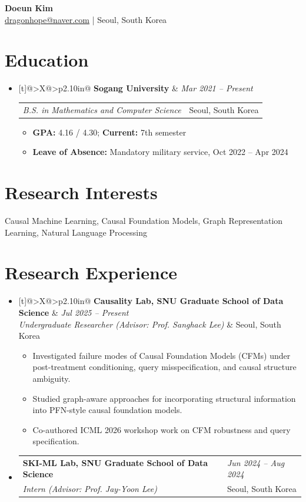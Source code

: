 \documentclass[11pt,a4paper]{article}
\makeatletter
\newcommand{\cvitem}[4]{%
  \item \begin{tabularx}{\linewidth}[t]{@{}>{\RaggedRight\arraybackslash}X@{\hspace{0.8em}}>{\RaggedLeft\arraybackslash}p{2.10in}@{}}
  \textbf{#1} & \textit{#2}\\
  \textit{#3} & #4
  \end{tabularx}\vspace{-0.18em}
}
\newcommand{\cvitemplain}[2]{%
  \item \begin{tabularx}{\linewidth}[t]{@{}>{\RaggedRight\arraybackslash}X@{\hspace{0.8em}}>{\RaggedLeft\arraybackslash}p{2.10in}@{}}
  \textbf{#1} & \textit{#2}
  \end{tabularx}\vspace{-0.18em}
}
\makeatother
\begin{document}
\begin{center}
    {\Huge \bfseries Doeun Kim}\\[0.38em]
    \href{mailto:dragonhope@naver.com}{dragonhope@naver.com} \; | \; Seoul, South Korea
\end{center}
\vspace{0.16em}

\section*{Education}
\begin{itemize}[label=$\bullet$, leftmargin=0.70em]
  \cvitemplain{Sogang University}{Mar 2021 -- Present}
  \vspace{-0.08em}
  \begin{tabularx}{\linewidth}{@{}Xr@{}}
  \textit{B.S. in Mathematics and Computer Science} & Seoul, South Korea
  \end{tabularx}
  \begin{itemize}
    \item \textbf{GPA:} 4.16 / 4.30; \textbf{Current:} 7th semester
    \item \textbf{Leave of Absence:} Mandatory military service, Oct 2022 -- Apr 2024
  \end{itemize}
\end{itemize}

\section*{Research Interests}
Causal Machine Learning, Causal Foundation Models, Graph Representation Learning, Natural Language Processing

\section*{Research Experience}
\begin{itemize}[label=$\bullet$, leftmargin=0.70em]
  \cvitem{Causality Lab, SNU Graduate School of Data Science}{Jul 2025 -- Present}{Undergraduate Researcher (Advisor: Prof. Sanghack Lee)}{Seoul, South Korea}
  \begin{itemize}
    \item Investigated failure modes of Causal Foundation Models (CFMs) under post-treatment conditioning, query misspecification, and causal structure ambiguity.
    \item Studied graph-aware approaches for incorporating structural information into PFN-style causal foundation models.
    \item Co-authored ICML 2026 workshop work on CFM robustness and query specification.
  \end{itemize}

  \cvitem{SKI-ML Lab, SNU Graduate School of Data Science}{Jun 2024 -- Aug 2024}{Intern (Advisor: Prof. Jay-Yoon Lee)}{Seoul, South Korea}
\end{itemize}
\end{document}
